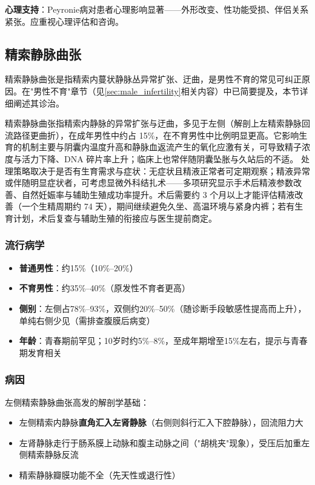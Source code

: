 \textbf{心理支持}：Peyronie病对患者心理影响显著——外形改变、性功能受损、伴侣关系紧张。应重视心理评估和咨询。

\subsection{精索静脉曲张}
\label{subsec:varicocele}

精索静脉曲张是指精索内蔓状静脉丛异常扩张、迂曲，是男性不育的常见可纠正原因。在"男性不育"章节（见\ref{sec:male_infertility}相关内容）中已简要提及，本节详细阐述其诊治。


精索静脉曲张指精索内静脉的异常扩张与迂曲，多见于左侧（解剖上左精索静脉回流路径更曲折），在成年男性中约占 15\%，在不育男性中比例明显更高。它影响生育的机制主要与阴囊内温度升高和静脉血返流产生的氧化应激有关，可导致精子浓度与活力下降、DNA 碎片率上升；临床上也常伴随阴囊坠胀与久站后的不适。
处理策略取决于是否有生育需求与症状：无症状且精液正常者可定期观察；精液异常或伴随明显症状者，可考虑显微外科结扎术——多项研究显示手术后精液参数改善、自然妊娠率与辅助生殖成功率提升。术后需要约 3 个月以上才能评估精液改善（一个生精周期约 74 天），期间继续避免久坐、高温环境与紧身内裤；若有生育计划，术后复查与辅助生殖的衔接应与医生提前商定。

\subsubsection{流行病学}

\begin{itemize}[leftmargin=2cm]
	\item \textbf{普通男性}：约15\%（10\%--20\%）
	\item \textbf{不育男性}：约35\%--40\%（原发性不育者更高）
	\item \textbf{侧别}：左侧占78\%--93\%，双侧约20\%--50\%（随诊断手段敏感性提高而上升），单纯右侧少见（需排查腹膜后病变）
	\item \textbf{年龄}：青春期前罕见；10岁时约5\%--8\%，至成年期增至15\%左右，提示与青春期发育相关
\end{itemize}

\subsubsection{病因}

左侧精索静脉曲张高发的解剖学基础：
\begin{itemize}[leftmargin=2cm]
	\item 左侧精索内静脉\textbf{直角汇入左肾静脉}（右侧则斜行汇入下腔静脉），回流阻力大
	\item 左肾静脉走行于肠系膜上动脉和腹主动脉之间（"胡桃夹"现象），受压后加重左侧精索静脉反流
	\item 精索静脉瓣膜功能不全（先天性或退行性）
\end{itemize}


